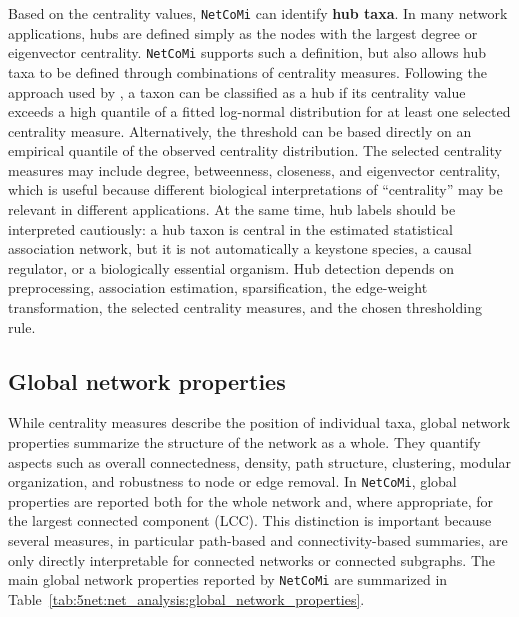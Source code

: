 Based on the centrality values, \texttt{NetCoMi} can identify \textbf{hub taxa}. In many network applications, hubs are defined simply as the nodes with the largest degree or eigenvector centrality. \texttt{NetCoMi} supports such a definition, but also allows hub taxa to be defined through combinations of centrality measures. Following the approach used by \citet{agler2016microbial}, a taxon can be classified as a hub if its centrality value exceeds a high quantile of a fitted log-normal distribution for at least one selected centrality measure. Alternatively, the threshold can be based directly on an empirical quantile of the observed centrality distribution. The selected centrality measures may include degree, betweenness, closeness, and eigenvector centrality, which is useful because different biological interpretations of ``centrality'' may be relevant in different applications. At the same time, hub labels should be interpreted cautiously: a hub taxon is central in the estimated statistical association network, but it is not automatically a keystone species, a causal regulator, or a biologically essential organism. Hub detection depends on preprocessing, association estimation, sparsification, the edge-weight transformation, the selected centrality measures, and the chosen thresholding rule.

\subsection{Global network properties}
\label{sec:5net:net_analysis:global}

While centrality measures describe the position of individual taxa, global network properties summarize the structure of the network as a whole. They quantify aspects such as overall connectedness, density, path structure, clustering, modular organization, and robustness to node or edge removal. In \texttt{NetCoMi}, global properties are reported both for the whole network and, where appropriate, for the largest connected component (LCC). This distinction is important because several measures, in particular path-based and connectivity-based summaries, are only directly interpretable for connected networks or connected subgraphs. The main global network properties reported by \texttt{NetCoMi} are summarized in Table~\ref{tab:5net:net_analysis:global_network_properties}.

